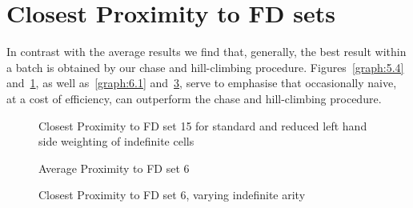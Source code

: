 \section{Closest Proximity to FD sets}

In contrast with the average results we find that, generally, the
best result within a batch is obtained by our chase and hill-climbing
procedure. Figures~\ref{graph:5.4} and~\ref{graph:5.5}, as well
as~\ref{graph:6.1} and~\ref{graph:5.15}, serve to emphasise that
occasionally naive, at a cost of efficiency, can outperform the chase
and hill-climbing procedure.


\begin{figure}
\begin{minipage}{7cm}
\centerline{}
\caption{\label{graph:5.4} {Closest Proximity to FD set 15 for
standard and reduced right hand side weighting of indefinite cells}}
\end{minipage}
\hfill
\begin{minipage}{7cm}
\centerline{}
\caption{\label{graph:5.5} {Closest Proximity to FD set 15 for
standard and reduced left hand side weighting of indefinite cells }}
\end{minipage}
\end{figure}

\begin{figure}
\begin{minipage}{7cm}
\centerline{}
\caption{\label{graph:5.13} {Average Proximity to  FD set 7}}
\end{minipage}
\hfill
\begin{minipage}{7cm}
\centerline{}
\caption{\label{graph:5.14} {Average Proximity to FD set 6}}
\end{minipage}
\end{figure}
\newpage

\begin{figure}
\begin{minipage}{7cm}
\centerline{}
\caption{\label{graph:6.1} {Closest Proximity to FD set 15, varying
domain sizes, chase and naive approaches }}
\end{minipage}
\hfill
\begin{minipage}{7cm}
\centerline{}
\caption{\label{graph:5.15} {Closest Proximity to FD set 6, varying
indefinite arity }}
\end{minipage}
\end{figure}


